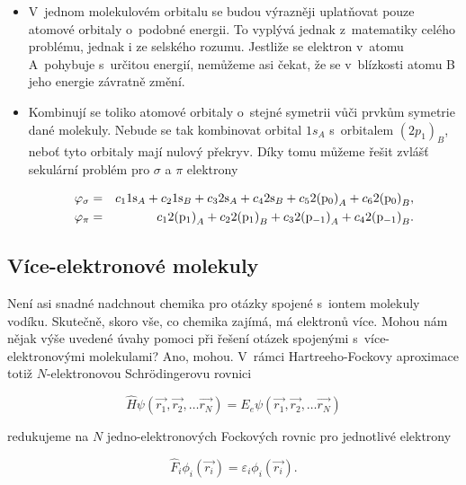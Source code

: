 \begin{itemize}
\item V~jednom molekulovém orbitalu se budou výrazněji uplatňovat pouze atomové orbitaly o~podobné energii. To vyplývá jednak z~matematiky celého problému, jednak i ze selského rozumu. Jestliže se elektron v~atomu A~pohybuje s~určitou energií, nemůžeme asi čekat, že se v~blízkosti atomu B jeho energie závratně změní.

\item Kombinují se toliko atomové orbitaly o~stejné symetrii vůči prvkům symetrie dané molekuly. Nebude se tak kombinovat orbital $1s_A$ s~orbitalem $(2p_1)_B$, neboť tyto orbitaly mají nulový překryv. Díky tomu můžeme řešit zvlášť sekulární problém pro $\sigma$ a $\pi$ elektrony

\begin{eqnarray}
\varphi_{\sigma} &=& c_1 1 \mathrm{s}_{A} + c_2 1 \mathrm{s}_{B} + c_3 
2 \mathrm{s}_{A} + c_4 2 \mathrm{s}_{B} + c_5 2 \mathrm{(p_0)}_{A} + c_6 2 \mathrm{(p_0)}_{B}, \nonumber \\
\varphi_{\pi} &=& c_1 2 \mathrm{(p_1)}_{A} + c_2 2 \mathrm{(p_1)}_{B} + c_3 
2 \mathrm{(p_{-1})}_{A} + c_4 2 \mathrm{(p_{-1})}_{B}.
\label{rov:ElStrukt-17}
\end{eqnarray}

\end{itemize}


\subsection{Více-elektronové molekuly}
Není asi snadné nadchnout chemika pro otázky spojené s~iontem molekuly vodíku. Skutečně, skoro vše, co chemika zajímá, má elektronů více. Mohou nám nějak výše uvedené úvahy pomoci při řešení otázek spojenými s~více-elektronovými molekulami? Ano, mohou. V~rámci Hartreeho-Fockovy aproximace totiž $N$-elektronovou Schr\"odingerovu rovnici 

\begin{equation}
\hat{H} \psi (\vec{r_1}, \vec{r_2}, \dots \vec{r_N}) = E_e\psi (\vec{r_1}, \vec{r_2}, \dots \vec{r_N})
\label{rov:ElStrukt-18}
\end{equation}

\noindent redukujeme na $N$ jedno-elektronových Fockových rovnic pro jednotlivé elektrony

\begin{equation}
\hat{F}_i \phi_i (\vec{r_i}) = \varepsilon_i \phi_i (\vec{r_i}).
\label{rov:ElStrukt-19}
\end{equation}

